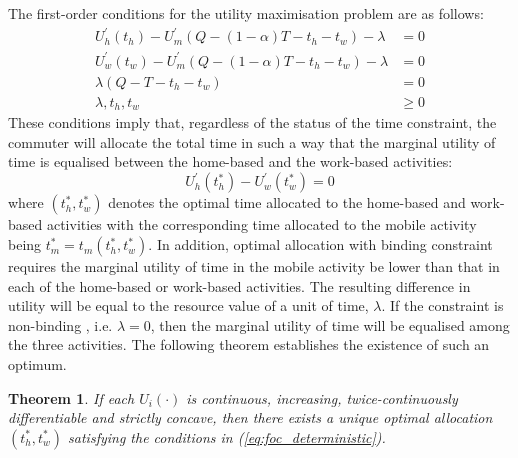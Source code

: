 \documentclass[12pt,a4paper,british]{article}
\newtheorem{theorem}{Theorem}[section]
\begin{document}

The first-order conditions for the utility maximisation problem are as follows:
\begin{subequations}
\begin{align}
U_{h}^{\prime}\left(t_{h}\right)-U_{m}^{\prime}\left(Q-\left(1-\alpha\right)T-t_{h}-t_{w}\right)-\lambda & =0
\label{eq:foc_deterministic_th} \\
U_{w}^{\prime}\left(t_{w}\right)-U_{m}^{\prime}\left(Q-\left(1-\alpha\right)T-t_{h}-t_{w}\right)-\lambda & =0
\label{eq:foc_deterministic_tw} \\
\lambda\left(Q-T-t_{h}-t_{w}\right) & =0
\label{eq:foc_deterministic_lmd} \\
\lambda,t_{h},t_{w} & \geq 0
\label{eq:foc_deterministic_nonnega}
\end{align}
\label{eq:foc_deterministic}
\end{subequations}
These conditions imply that, regardless of the status of the time constraint, the commuter will allocate the total time in such a way that the marginal utility of time is equalised between the home-based and the work-based activities:%
\begin{equation}
U_{h}^{\prime}\left(t_{h}^{\ast}\right)-U_{w}^{\prime}\left(t_{w}^{\ast}\right)=0\label{eq:Uh_eq_Uw}
\end{equation}%
where $\left(t_{h}^{\ast},t_{w}^{\ast}\right)$ denotes the optimal time allocated to the home-based and work-based activities with the corresponding time allocated to the mobile activity being $t_{m}^{\ast}=t_{m}\left(t_{h}^{\ast},t_{w}^{\ast}\right)$. In addition, optimal allocation with binding constraint requires the marginal utility of time in the mobile activity be lower than that in each of the home-based or work-based activities. The resulting difference in utility will be equal to the resource value of a unit of time, $\lambda$. If the constraint is non-binding , i.e. $\lambda=0$, then the marginal utility of time will be equalised among the three activities. The following theorem establishes the existence of such an optimum.

\begin{theorem}
\label{thm:optimum_det}
If each $U_{i}\left(\cdot\right)$ is continuous, increasing, twice-continuously differentiable and strictly concave, then there exists a unique optimal allocation $\left( t_{h}^{\ast}, t_{w}^{\ast} \right)$ satisfying the conditions in (\ref{eq:foc_deterministic}).
\end{theorem}
\end{document}
